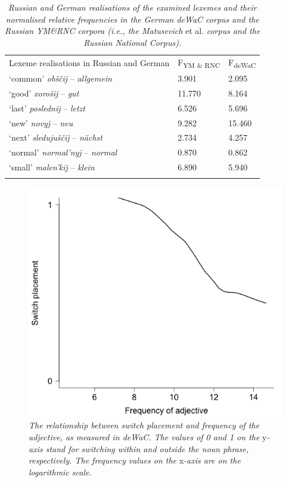 \begin{table}[]
		{\begin{tabularx}{\textwidth}{XR{2cm}R{2cm}}
			\midrule
			\addlinespace[2mm]
			Lexeme realisations in Russian and German & F\textsubscript{YM \& RNC}	&F\textsubscript{deWaC} \\ \addlinespace[2mm] \midrule
			\addlinespace[2mm]
			`common' \textit{obščij} -- \textit{allgemein}	&3.901	&2.095\\
			`good' \textit{xorošij} -- \textit{gut}	&11.770	&8.164\\
			`last' \textit{poslednij} -- \textit{letzt} 	&6.526	&5.696\\
			`new' \textit{novyj} -- \textit{neu}		&9.282	&15.460\\
			`next' \textit{sledujuščij} -- \textit{nächst} 	&2.734	&4.257\\
			`normal' \textit{normal'nyj} -- \textit{normal}	&0.870	&0.862\\
			`small' \textit{malen'kij} -- \textit{klein}	&6.890	&5.940\\
			\addlinespace[2mm]
			\midrule
		\end{tabularx}}
\caption{\textit{Russian and German realisations of the examined lexemes and their normalised relative frequencies in the German deWaC corpus and the Russian YM\&RNC corpora (i.e., the Matusevich} et al. \textit{corpus and the Russian National Corpus).}}{\label{tab:4:5}}
\end{table}

\begin{figure}
	\centering
    	\includegraphics[scale=0.5]{figures/4-Fr_A_DEWAC.png}
	\caption{\textit{The relationship between switch placement and frequency of the adjective, as measured in deWaC. The values of 0 and 1 on the} y\textit{-axis stand for switching within and outside the noun phrase, respectively. The frequency values on the} x\textit{-axis are on the logarithmic scale.}}
	\label{fig:4:adj_de}
\end{figure}

